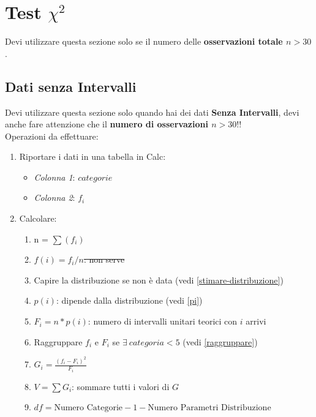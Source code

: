\section{Test \texorpdfstring{$\chi^2$}{chi quadro}}

Devi utilizzare questa sezione solo se il numero delle \textbf{osservazioni
      totale $n > 30$}.

\subsection{Dati senza Intervalli}

Devi utilizzare questa sezione solo quando hai dei dati \textbf{Senza
      Intervalli}, devi anche fare attenzione che il \textbf{numero di
      osservazioni $n > 30$}!!\\

Operazioni da effettuare:

\begin{enumerate}
      \item Riportare i dati in una tabella in Calc:
            \begin{itemize}
                  \item \textit{Colonna 1}: $categorie$
                  \item \textit{Colonna 2}: $f_i$
            \end{itemize}
      \item Calcolare:
            \begin{enumerate}
                  \item n = $\sum(f_i)$
                  \item \st{$f(i) = f_i / n$: non serve}
                  \item Capire la distribuzione se non è data (vedi
                        \ref{stimare-distribuzione})
                  \item $p(i)$: dipende dalla distribuzione (vedi \ref{pi})
                  \item $F_i = n * p(i)$: numero di intervalli unitari teorici
                        con $i$ arrivi
                  \item Raggruppare $f_i$ e $F_i$ se $\exists \ categoria < 5$ (vedi \ref{raggruppare})
                  \item $G_i = \frac{(f_i - F_i)^2}{F_i}$
                  \item $V = \sum G_i$: sommare tutti i valori di $G$
                  \item $df = \text{Numero Categorie} - 1 - \text{Numero
                                    Parametri Distribuzione}$
            \end{enumerate}
\end{enumerate}

